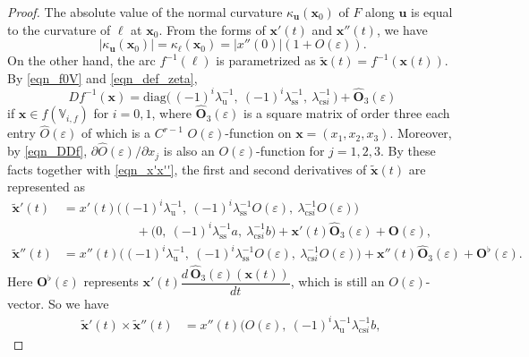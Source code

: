 \documentclass{amsart}
\theoremstyle{definition}
\numberwithin{equation}{section}
\numberwithin{figure}{section}
\begin{document}
\begin{proof}
The absolute value of the normal curvature $\kappa_{\boldsymbol{u}}(\boldsymbol{x}_0)$ of $F$ along $\boldsymbol{u}$ is equal to the curvature of $\ell$ at $\boldsymbol{x}_0$.
From the forms of $\boldsymbol{x}'(t)$ and $\boldsymbol{x}''(t)$, 
we have
\begin{equation}\label{eqn_kappau}
|\kappa_{\boldsymbol{u}}(\boldsymbol{x}_0)|=\kappa_\ell(\boldsymbol{x}_0)=|x''(0)|(1+O(\varepsilon)).
\end{equation}
On the other hand, the arc $f^{-1}(\ell)$ is parametrized as $\widetilde{\boldsymbol{x}}(t)=f^{-1}(\boldsymbol{x}(t))$.
By \eqref{eqn_f0V} and \eqref{eqn_def_zeta}, 
$$Df^{-1}(\boldsymbol{x})=\mathrm{diag}\bigl(\,(-1)^i\lambda_{\mathrm{u}}^{-1},\ (-1)^i\lambda_{\mathrm{ss}}^{-1},\ 
\lambda_{\mathrm{cs} i}^{-1}\,\bigr)+\widehat{\boldsymbol{O}}_3(\varepsilon)$$
if $\boldsymbol{x}\in f(\mathbb{V}_{i,f})$ for $i=0,1$, 
where $\widehat{\boldsymbol{O}}_3(\varepsilon)$ is a square matrix of order three each entry $\widehat O(\varepsilon)$ of which 
is a $C^{r-1}$ $O(\varepsilon)$-function on $\boldsymbol{x}=(x_1,x_2,x_3)$.
Moreover, by \eqref{eqn_DDf}, $\partial \widehat O(\varepsilon)/\partial x_j$ is also an $O(\varepsilon)$-function for $j=1,2,3$.
By these facts together with \eqref{eqn_x'x''}, the first and second derivatives of $\widetilde{\boldsymbol{x}}(t)$ are represented as
\begin{align*}
\widetilde{\boldsymbol{x}}'(t)&=
x'(t)\bigl((-1)^i\lambda_{\mathrm{u}}^{-1},\ (-1)^i\lambda_{\mathrm{ss}}^{-1}O(\varepsilon),\ \lambda_{\mathrm{cs} i}^{-1}O(\varepsilon)\bigr)\\
&\hspace{70pt}+\bigl(0,\ (-1)^i\lambda_{\mathrm{ss}}^{-1}a,\ \lambda_{\mathrm{cs} i}^{-1}b\bigr)+\boldsymbol{x}'(t)\widehat{\boldsymbol{O}}_3(\varepsilon)+\boldsymbol{O}(\varepsilon),\\
\widetilde{\boldsymbol{x}}''(t)&=x''(t)
\bigl((-1)^i\lambda_{\mathrm{u}}^{-1},\ (-1)^i\lambda_{\mathrm{ss}}^{-1}O(\varepsilon),\ \lambda_{\mathrm{cs} i}^{-1}O(\varepsilon)\bigr)
+\boldsymbol{x}''(t)\widehat{\boldsymbol{O}}_3(\varepsilon)+\boldsymbol{O}^\flat(\varepsilon).
\end{align*}
Here $\boldsymbol{O}^\flat(\varepsilon)$ represents $\boldsymbol{x}'(t)\dfrac{d\,\widehat{\boldsymbol{O}}_3(\varepsilon)(\boldsymbol{x}(t))}{dt}$, 
which is still an $O(\varepsilon)$-vector.
So we have  
\begin{align*}
\widetilde{\boldsymbol{x}}'(t)\times \widetilde{\boldsymbol{x}}''(t)&=x''(t)\bigl(O(\varepsilon),\ (-1)^i\lambda_{\mathrm{u}}^{-1}\lambda_{\mathrm{cs} i}^{-1}b,\ 

\end{align*}
\end{proof}
\end{document}
